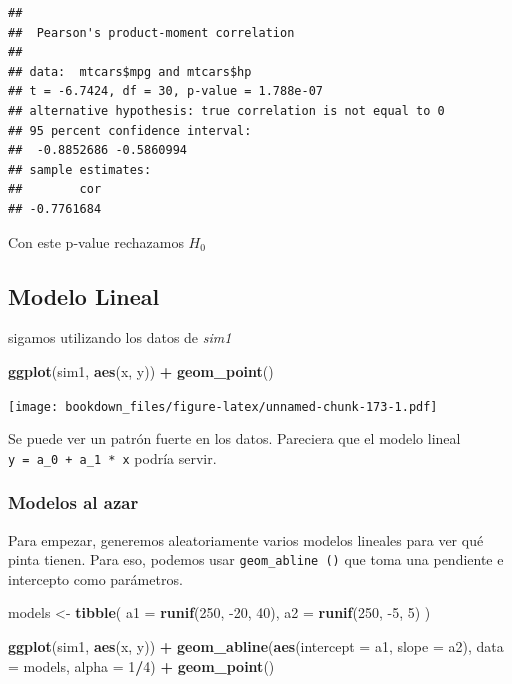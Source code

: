 \documentclass[]{book}
\newenvironment{Shaded}{\begin{snugshade}}{\end{snugshade}}
\newcommand{\DataTypeTok}[1]{\textcolor[rgb]{0.13,0.29,0.53}{#1}}
\newcommand{\DecValTok}[1]{\textcolor[rgb]{0.00,0.00,0.81}{#1}}
\newcommand{\KeywordTok}[1]{\textcolor[rgb]{0.13,0.29,0.53}{\textbf{#1}}}
\newcommand{\NormalTok}[1]{#1}
\newcommand{\OperatorTok}[1]{\textcolor[rgb]{0.81,0.36,0.00}{\textbf{#1}}}
\newcommand{\StringTok}[1]{\textcolor[rgb]{0.31,0.60,0.02}{#1}}
\begin{document}
\begin{verbatim}
## 
##  Pearson's product-moment correlation
## 
## data:  mtcars$mpg and mtcars$hp
## t = -6.7424, df = 30, p-value = 1.788e-07
## alternative hypothesis: true correlation is not equal to 0
## 95 percent confidence interval:
##  -0.8852686 -0.5860994
## sample estimates:
##        cor 
## -0.7761684
\end{verbatim}

Con este p-value rechazamos \(H_0\)

\hypertarget{modelo-lineal-1}{%
\subsection{Modelo Lineal}\label{modelo-lineal-1}}

sigamos utilizando los datos de \emph{sim1}

\begin{Shaded}
\begin{Highlighting}[]
\KeywordTok{ggplot}\NormalTok{(sim1, }\KeywordTok{aes}\NormalTok{(x, y)) }\OperatorTok{+}\StringTok{ }
\StringTok{  }\KeywordTok{geom_point}\NormalTok{()}
\end{Highlighting}
\end{Shaded}

\texttt{[image: bookdown\_files/figure-latex/unnamed-chunk-173-1.pdf]}

Se puede ver un patrón fuerte en los datos. Pareciera que el modelo lineal \texttt{y\ =\ a\_0\ +\ a\_1\ *\ x} podría servir.

\hypertarget{modelos-al-azar}{%
\subsubsection{Modelos al azar}\label{modelos-al-azar}}

Para empezar, generemos aleatoriamente varios modelos lineales para ver qué pinta tienen. Para eso, podemos usar \texttt{geom\_abline\ ()} que toma una pendiente e intercepto como parámetros.

\begin{Shaded}
\begin{Highlighting}[]
\NormalTok{models <-}\StringTok{ }\KeywordTok{tibble}\NormalTok{(}
  \DataTypeTok{a1 =} \KeywordTok{runif}\NormalTok{(}\DecValTok{250}\NormalTok{, }\DecValTok{-20}\NormalTok{, }\DecValTok{40}\NormalTok{),}
  \DataTypeTok{a2 =} \KeywordTok{runif}\NormalTok{(}\DecValTok{250}\NormalTok{, }\DecValTok{-5}\NormalTok{, }\DecValTok{5}\NormalTok{)}
\NormalTok{)}

\KeywordTok{ggplot}\NormalTok{(sim1, }\KeywordTok{aes}\NormalTok{(x, y)) }\OperatorTok{+}\StringTok{ }
\StringTok{  }\KeywordTok{geom_abline}\NormalTok{(}\KeywordTok{aes}\NormalTok{(}\DataTypeTok{intercept =}\NormalTok{ a1, }\DataTypeTok{slope =}\NormalTok{ a2), }\DataTypeTok{data =}\NormalTok{ models, }\DataTypeTok{alpha =} \DecValTok{1}\OperatorTok{/}\DecValTok{4}\NormalTok{) }\OperatorTok{+}
\StringTok{  }\KeywordTok{geom_point}\NormalTok{() }
\end{Highlighting}
\end{Shaded}
\end{document}
